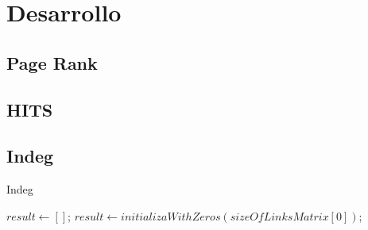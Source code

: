 \section{Desarrollo}

\subsection{Page Rank}

\subsection{HITS}

\subsection{Indeg}

\begin{algorithm}
\caption{Indeg}\label{euclid}
\begin{algorithmic}[1]
\State $result \gets []$;
\State $result \gets initializaWithZeros(sizeOfLinksMatrix[0])$;
	\ENDFOR
\ENDFOR
\end{algorithmic}
\end{algorithm}
